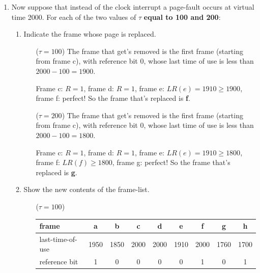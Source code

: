 \documentclass[11pt]{article}
\newcommand{\n}{\vspace{0.3cm}}
\begin{document}
\begin{enumerate}
\begin{enumerate}
      \item Now suppose that instead of the clock interrupt a page-fault occurs at virtual time 2000.  For each of the two values of \(\tau\) \textbf{equal to 100 and 200}:
        \begin{enumerate}
          \item Indicate the frame whose page is replaced. \n
            \begin{enumerate}
              \item[(\(\tau = 100\))] The frame that get's removed is the first frame (starting from frame c), with reference bit 0, whose last time of use is less than \(2000 - 100 = 1900\).

                Frame c: \(R=1\), frame d: \(R=1\), frame e: \(LR(e) = 1910 \geq 1900\), frame f: perfect!  So the frame that's replaced is \textbf{f}. \n

              \item[(\(\tau = 200\))] The frame that get's removed is the first frame (starting from frame c), with reference bit 0, whose last time of use is less than \(2000 - 100 = 1800\).

                Frame c: \(R=1\), frame d: \(R=1\), frame e: \(LR(e) = 1910 \geq 1800\), frame f: \(LR(f) \geq 1800\), frame g: perfect!  So the frame that's replaced is \textbf{g}.
            \end{enumerate} \n

          \item Show the new contents of the frame-list. \n
            \begin{enumerate}
              \item[(\(\tau = 100\))] 
                \begin{center}
                  \begin{tabular}[c]{|l|c|c|c|c|c|c|c|c|}
                    \hline
                    frame & a & b & c & d & e & f & g & h \\
                    \hline
                    last-time-of-use & 1950 & 1850 & 2000 & 2000 & 1910 & 2000 & 1760 & 1700 \\
                    \hline
                    reference bit & 1 & 0 & 0 & 0 & 0 & 1 & 0 & 1 \\
                    \hline
                  \end{tabular}
                \end{center} \n


\end{enumerate}
\end{enumerate}
\end{enumerate}
\end{enumerate}
\end{document}
